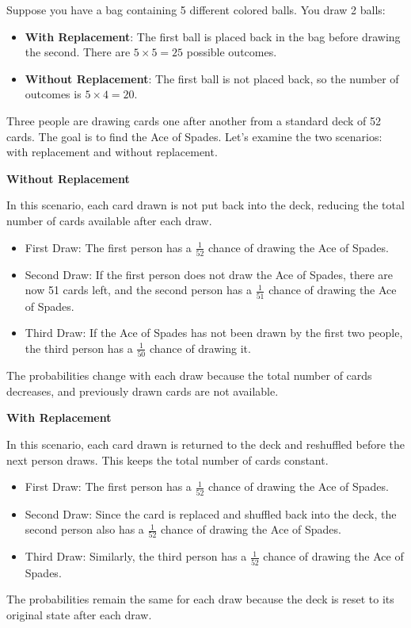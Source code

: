 \begin{example}
    Suppose you have a bag containing 5 different colored balls. You draw 2 balls:
\begin{itemize}
    \item \textbf{With Replacement}: The first ball is placed back in the bag before drawing the second. There are \(5 \times 5 = 25\) possible outcomes.
    \item \textbf{Without Replacement}: The first ball is not placed back, so the number of outcomes is \(5 \times 4 = 20\).
\end{itemize}
\end{example}

\begin{example}
    Three people are drawing cards one after another from a standard deck of 52 cards. The goal is to find the Ace of Spades. Let's examine the two scenarios: with replacement and without replacement.

    \textbf{Without Replacement}

    In this scenario, each card drawn is not put back into the deck, reducing the total number of cards available after each draw.
    \begin{itemize}
        \item First Draw: The first person has a $\frac{1}{52}$ chance of drawing the Ace of Spades.
        \item Second Draw: If the first person does not draw the Ace of Spades, there are now 51 cards left, and the second person has a $\frac{1}{51}$ chance of drawing the Ace of Spades.
        \item Third Draw: If the Ace of Spades has not been drawn by the first two people, the third person has a $\frac{1}{50}$ chance of drawing it.
    \end{itemize}
    
    The probabilities change with each draw because the total number of cards decreases, and previously drawn cards are not available.
    
    \textbf{With Replacement}

    In this scenario, each card drawn is returned to the deck and reshuffled before the next person draws. This keeps the total number of cards constant.
    \begin{itemize}
        \item First Draw: The first person has a $\frac{1}{52}$ chance of drawing the Ace of Spades.
        \item Second Draw: Since the card is replaced and shuffled back into the deck, the second person also has a $\frac{1}{52}$ chance of drawing the Ace of Spades.
        \item Third Draw: Similarly, the third person has a $\frac{1}{52}$ chance of drawing the Ace of Spades.
    \end{itemize}
    
    The probabilities remain the same for each draw because the deck is reset to its original state after each draw.

\end{example}

